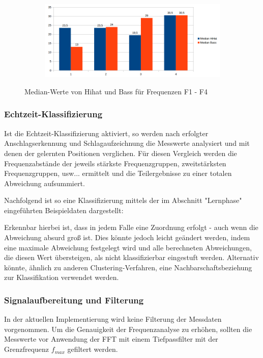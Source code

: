 \begin{figure}[H]
\centering
\begin{subfigure}{.5\textwidth}
		\includegraphics[scale=0.5]{figures/Median_hihatbass.png}
\end{subfigure}
\caption{Median-Werte  von Hihat und Bass für Frequenzen F1 - F4}
\label{fig:FFT_Median}
\end{figure}


\subsubsection*{Echtzeit-Klassifizierung}
Ist die Echtzeit-Klassifizierung aktiviert, so werden nach erfolgter Anschlagserkennung und Schlagaufzeichnung die Messwerte analysiert und mit denen der gelernten Positionen verglichen. 
Für diesen Vergleich werden die Frequenzabstände der jeweils stärkste Frequenzgruppen, zweitstärksten Frequenzgruppen, usw... ermittelt und die Teilergebnisse zu einer totalen Abweichung aufsummiert.

Nachfolgend ist so eine Klassifizierung mittels der im Abschnitt "Lernphase" eingeführten Beispieldaten dargestellt:


 
Erkennbar hierbei ist, dass in jedem Falle eine Zuordnung erfolgt - auch wenn die Abweichung absurd groß ist. Dies könnte jedoch leicht geändert werden, indem eine maximale Abweichung festgelegt wird und alle berechneten Abweichungen, die diesen Wert übersteigen, als nicht klassifizierbar eingestuft werden. Alternativ könnte, ähnlich zu anderen Clustering-Verfahren, eine Nachbarschaftsbeziehung zur Klassifikation verwendet werden.

\subsubsection*{Signalaufbereitung und Filterung}

In der aktuellen Implementierung wird keine Filterung der Messdaten vorgenommen. 
Um die Genauigkeit der Frequenzanalyse zu erhöhen, sollten die Messwerte vor Anwendung der FFT mit einem Tiefpassfilter mit der Grenzfrequenz $f_{max}$ gefiltert werden.

